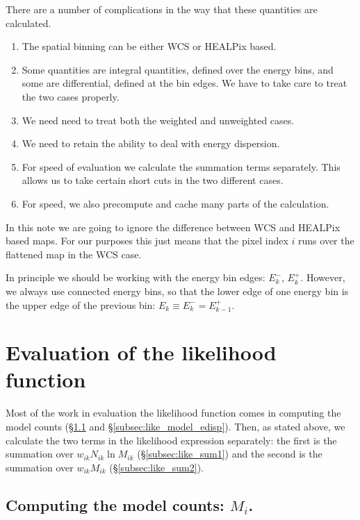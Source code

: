 \documentclass[preprint]{aastex}
\begin{document}
There are a number of complications in the way that these quantities
are calculated.
\begin{enumerate}
\item The spatial binning can be either WCS or HEALPix based.
\item Some quantities are integral quantities, defined over the energy
  bins, and some are differential, defined at the bin edges.  We have
  to take care to treat the two cases properly.
\item We need need to treat both the weighted and unweighted cases.
\item We need to retain the ability to deal with energy dispersion.
\item For speed of evaluation we calculate the summation terms
  separately. This allows us to take certain short cuts in
  the two different cases.
\item For speed, we also precompute and cache many parts of the
  calculation.
\end{enumerate}

In this note we are going to ignore the difference between WCS and
HEALPix based maps.  For our purposes this just means that the pixel
index $i$ runs over the flattened map in the WCS case.

In principle we should be working with the energy bin edges: $E_k^-$,
$E_k^+$.  However, we always use connected energy bins, so that the
lower edge of one energy bin is the upper edge of the previous bin:
$E_k \equiv E_k^- = E_{k-1}^+$.


\section{Evaluation of the likelihood function}\label{sec:like}

Most of the work in evaluation the likelihood function comes in
computing the model counts (\S\ref{subsec:like_model_counts} and
\S\ref{subsec:like_model_edisp}).  Then, as stated above, we calculate
the two terms in the likelihood expression separately: the first is
the summation over $ w_{ik} N_{ik} \ln M_{ik}$ (\S\ref{subsec:like_sum1}) and
the second is the summation over $w_{ik} M_{ik}$ (\S\ref{subsec:like_sum2}).


\subsection{Computing the model counts: $M_i$.}\label{subsec:like_model_counts}
\end{document}
